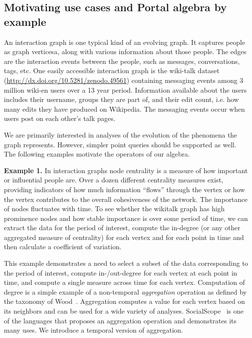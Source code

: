 \subsection{Motivating use cases and Portal algebra by example}
\label{sec:cases}

  
An interaction graph is one typical kind of an evolving graph.  It
captures people as graph verticesa, along with various information
about those people.  The edges are the interaction events between the
people, such as messages, conversations, tags, etc.  One easily
accessible interaction graph is the wiki-talk dataset
(\url{http://dx.doi.org/10.5281/zenodo.49561}) containing messaging
events among 3 million wiki-en users over a 13 year period.
Information available about the users includes their username, groups
they are part of, and their edit count, i.e. how many edits they have
produced on Wikipedia.  The messaging events occur when users post on
each other's talk pages.

We are primarily interested in analyses of the evolution of the
phenomena the graph represents.  However, simpler point queries should
be supported as well.  The following examples motivate the operators
of our algebra.

{\bf Example 1.}  In interaction graphs node centrality is a measure
of how important or influential people are.  Over a dozen different
centrality measures exist, providing indicators of how much
information ``flows'' through the vertex or how the vertex contributes
to the overall cohesiveness of the network.  The importance of nodes
fluctuates with time.  To see whether the wikitalk graph has high
prominence nodes and how stable importance is over some period of
time, we can extract the data for the period of interest, compute the
in-degree (or any other aggregated measure of centrality) for each
vertex and for each point in time and then calculate a coefficient of
variation.

This example demonstrates a need to select a subset of the data
corresponding to the period of interest, compute in-/out-degree for
each vertex at each point in time, and compute a single measure across
time for each vertex.  Computation of degree is a simple example of a
non-temporal {\em aggregation} operation as defined by the taxonomy of
Wood~\cite{Wood2012}.  Aggregation computes a value for each vertex
based on its neighbors and can be used for a wide variety of analyses.
SocialScope~\cite{Amer-Yahia2009} is one of the languages that proposes
an aggregation operation and demonstrates its many uses.  We introduce
a temporal version of aggregation.

